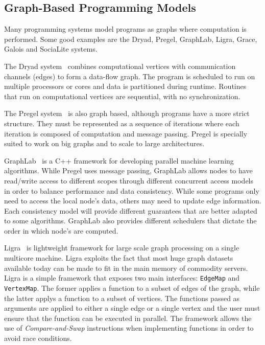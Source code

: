 \subsection{Graph-Based Programming Models}

Many programming systems model programs as graphs where computation is
performed. Some good examples are the Dryad, Pregel, GraphLab, Ligra, Grace,
Galois and SociaLite systems.

The Dryad system~\cite{Isard:2007:DDD:1272996.1273005} combines computational
vertices with communication channels (edges) to form a data-flow graph. The
program is scheduled to run on multiple processors or cores and data is
partitioned during runtime. Routines that run on computational vertices are
sequential, with no synchronization.

The Pregel system~\cite{Malewicz:2010:PSL:1807167.1807184} is also graph based,
although programs have a more strict structure. They must be represented as
a sequence of iterations where each iteration is composed of computation and
message passing.  Pregel is specially suited to work on big graphs and to
scale to large architectures.

GraphLab~\cite{GraphLab2010} is a C++ framework for developing parallel machine
learning algorithms. While Pregel uses message passing, GraphLab allows nodes to
have read/write access to different scopes through different concurrent access
models in order to balance performance and data consistency. While some programs
only need to access the local node's data, others may need to update edge
information. Each consistency model will provide different guarantees that are
better adapted to some algorithms. GraphLab also provides different schedulers
that dictate the order in which node's are computed.

Ligra~\cite{Shun:2013:LLG:2517327.2442530} is lightweight framework for large scale
graph processing on a single multicore machine. Ligra exploits the fact that
most huge graph datasets available today can be made to fit in the main memory
of commodity servers. Ligra is a simple framework that exposes 
two main interfaces: \texttt{EdgeMap} and \texttt{VertexMap}. The former applies
a function to a subset of edges of the graph, while the latter applys a function
to a subset of vertices. The functions passed as arguments are applied to either
a single edge or a single vertex and the user must ensure that the function can
be executed in parallel. The framework allows the use of \emph{Compare-and-Swap}
instructions when implementing functions in order to avoid race conditions.

